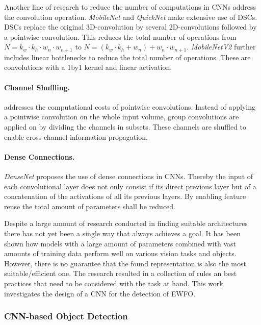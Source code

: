 Another line of research to reduce the number of computations in \acp{CNN} address the convolution operation. \textit{MobileNet} \cite{Howard2017} and \textit{QuickNet} \cite{Ghosh2017} make extensive use of \acp{DSC}. \acp{DSC} replace the original 3D-convolution by several 2D-convolutions followed by a pointwise convolution. This reduces the total number of operations from $N = k_w \cdot k_h \cdot w_n \cdot w_{n+1}$ to $N=(k_w \cdot k_h + w_n)+w_n \cdot w_{n+1}$. \textit{MobileNetV2} \cite{Sandler2018} further includes linear bottlenecks to reduce the total number of operations. These are convolutions with a 1by1 kernel and linear activation.

\paragraph{Channel Shuffling.}

\cite{Zhang2017a} addresses the computational costs of pointwise convolutions. Instead of applying a pointwise convolution on the whole input volume, group convolutions are applied on by dividing the channels in subsets. These channels are shuffled to enable cross-channel information propagation. 

\paragraph{Dense Connections.}
\textit{DenseNet} \cite{Huang2016} proposes the use of dense connections in \acp{CNN}. Thereby the input of each convolutional layer does not only consist if its direct previous layer but of a concatenation of the activations of all its previous layers. By enabling feature reuse the total amount of parameters shall be reduced.

Despite a large amount of research conducted in finding suitable architectures there has not yet been a single way that always achieves a goal. It has been shown how models with a large amount of parameters combined with vast amounts of training data perform well on various vision tasks and objects. However, there is no guarantee that the found representation is also the most suitable/efficient one. The research resulted in a collection of rules an best practices that need to be considered with the task at hand. This work investigates the design of a \ac{CNN} for the detection of \ac{EWFO}.

\subsubsection{\ac{CNN}-based Object Detection}

